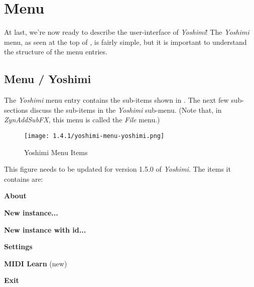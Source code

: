 %
%
%

\section{Menu}
\label{sec:menu}

   At last, we're now ready to describe the user-interface of \textsl{Yoshimi}!
   The \textsl{Yoshimi} menu, as seen at the top of
   ,
   is fairly simple, but it is important to understand the
   structure of the menu entries.

\subsection{Menu / Yoshimi}
\label{subsec:menu_yoshimi}

   The \textsl{Yoshimi}
   menu entry contains the sub-items shown in
   .
   The next few sub-sections discuss the sub-items in the 
   \textsl{Yoshimi} sub-menu.
   (Note that, in \textsl{ZynAddSubFX}, this menu is called the
   \textsl{File} menu.)

\begin{figure}[H]
   \centering 
   \texttt{[image: 1.4.1/yoshimi-menu-yoshimi.png]}
   \caption{Yoshimi Menu Items}
   \label{fig:yoshimi_menu_items}
\end{figure}

   This figure needs to be updated for version 1.5.0 of \textsl{Yoshimi}.
   The items it contains are:

   \begin{enumber}
      \item \textbf{About}
      \item \textbf{New instance...}
      \item \textbf{New instance with id...}
      \item \textbf{Settings}
      \item \textbf{MIDI Learn}  (new)
      \item \textbf{Exit}
   \end{enumber}

